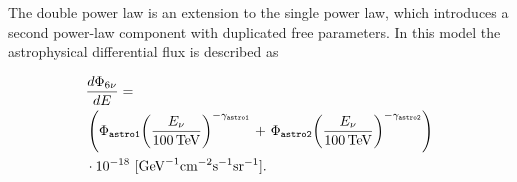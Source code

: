 The double power law is an extension to the single power law, which introduces a second power-law component with duplicated free parameters.
In this model the astrophysical differential flux is described as
\begin{linenomath*}
	\begin{equation}
	\begin{split}
	&\frac{d\Phi_{6\nu}}{dE} = \\
	&\left(\Phi_\texttt{astro1}{\left(\frac{E_\nu}{\SI{100}\TeV}\right)}^{-\gamma_\texttt{astro1}}\right. + \left. \Phi_\texttt{astro2}{\left(\frac{E_\nu}{\SI{100}\TeV}\right)}^{-\gamma_\texttt{astro2}}\right) \\
	& \cdot 10^{-18}~[\textmd{GeV}^{-1}\textmd{cm}^{-2}\textmd{s}^{-1}\textmd{sr}^{-1}].
	\end{split}
	\label{eq:dpl_flux}
	\end{equation}
\end{linenomath*}

